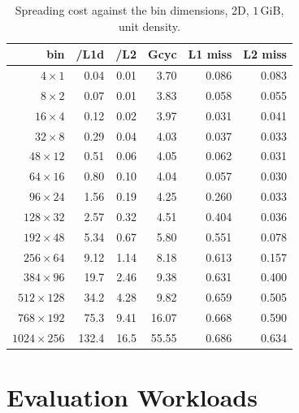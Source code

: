 \begin{table}[ht]
    \centering
    \small
    \begin{tabular}{rrrrrr}
        \hline
        bin & /L1d & /L2 & Gcyc & L1 miss & L2 miss \\
        \hline
        $4\times1$ & 0.04 & 0.01 & 3.70 & 0.086 & 0.083 \\
        $8\times2$ & 0.07 & 0.01 & 3.83 & 0.058 & 0.055 \\
        $16\times4$ & 0.12 & 0.02 & 3.97 & 0.031 & 0.041 \\
        $32\times8$ & 0.29 & 0.04 & 4.03 & 0.037 & 0.033 \\
        $48\times12$ & 0.51 & 0.06 & 4.05 & 0.062 & 0.031 \\
        $64\times16$ & 0.80 & 0.10 & 4.04 & 0.057 & 0.030 \\
        $96\times24$ & 1.56 & 0.19 & 4.25 & 0.260 & 0.033 \\
        $128\times32$ & 2.57 & 0.32 & 4.51 & 0.404 & 0.036 \\
        $192\times48$ & 5.34 & 0.67 & 5.80 & 0.551 & 0.078 \\
        $256\times64$ & 9.12 & 1.14 & 8.18 & 0.613 & 0.157 \\
        $384\times96$ & 19.7 & 2.46 & 9.38 & 0.631 & 0.400 \\
        $512\times128$ & 34.2 & 4.28 & 9.82 & 0.659 & 0.505 \\
        $768\times192$ & 75.3 & 9.41 & 16.07 & 0.668 & 0.590 \\
        $1024\times256$ & 132.4 & 16.5 & 55.55 & 0.686 & 0.634 \\
        \hline
    \end{tabular}
    \caption{Spreading cost against the bin dimensions, 2D, $1$\,GiB, unit density.}
    \label{tab:spread_l2}
\end{table}


\section{Evaluation Workloads}
\label{sec:eval_workloads}

